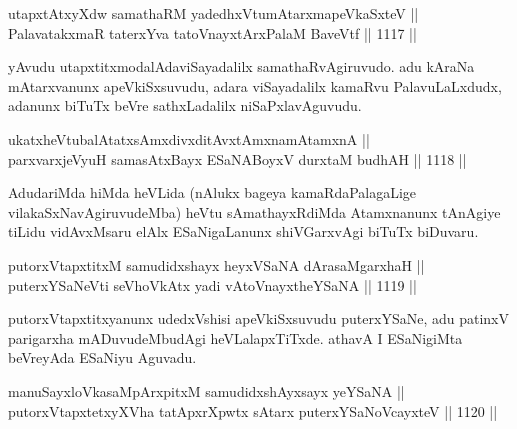 
\begin{shl}
utapxtAtxyXdw samathaRM yadedhxVtumAtarxmapeVkaSxteV ||  \\
PalavatakxmaR taterxYva tatoV\s nayxtArxPalaM BaveVtf ||  1117 ||  
\end{shl}

\begin{artha}
yAvudu utapxtitxmodalAdaviSayadalilx samathaRvAgiruvudo. adu kAraNa mAtarxvanunx 
apeVkiSxsuvudu, adara viSayadalilx kamaRvu PalavuLaLxdudx, adanunx biTuTx beVre 
sathxLadalilx niSaPxlavAguvudu.
\end{artha}

\begin{shl}
ukatxheVtubalAtatxsAmxdivxditAvx\s \s tAmxnamAtamxnA ||  \\
parxvarxjeVyuH samasAtxBayx ESaNABoyxV durxtaM budhAH ||  1118 ||  
\end{shl}

\begin{artha}
AdudariMda hiMda heVLida (nAlukx bageya kamaRdaPalagaLige vilakaSxNavAgiruvudeMba) heVtu sAmathayxRdiMda Atamxnanunx tAnAgiye tiLidu vidAvxMsaru elAlx ESaNigaLanunx shiVGarxvAgi biTuTx biDuvaru.
\end{artha}


\begin{shl}
putorxVtapxtitxM samudidxshayx heyxVSaNA dArasaMgarxhaH || \\
puterxYSaNeVti seVhoVkAtx yadi vA\s toV\s nayxtheYSaNA ||  1119 ||  
\end{shl}

\begin{artha}
putorxVtapxtitxyanunx udedxVshisi apeVkiSxsuvudu puterxYSaNe, adu patinxV parigarxha mADuvudeMbudAgi heVLalapxTiTxde. athavA I ESaNigiMta beVreyAda ESaNiyu Aguvadu.
\end{artha}


\begin{shl}
\footnotemark[1]manuSayxloVkasaMpArxpitxM samudidxshAyxsayx yeYSaNA || \\
putorxVtapxtetxyXVha tatApxrXpwtx sA\s tarx puterxYSaNoVcayxteV ||  1120 ||  
\end{shl}

